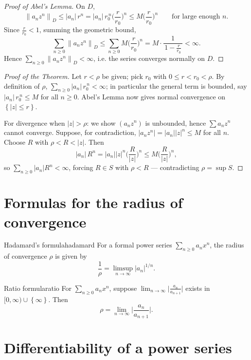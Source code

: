 \documentclass[11pt,openany]{report}
\newcommand{\abs}[1]{\left\lvert #1 \right\rvert}
\newcommand{\norm}[1]{\left\lVert #1 \right\rVert}
\newcommand{\set}[1]{\left\{ #1 \right\}}
\begin{document}
\begin{proof}[Proof of Abel's Lemma]
On $D$,
\[
  \norm{a_n z^n}_D \le \abs{a_n}\,r^{n}
  = \abs{a_n}\,r_0^{\,n}\Big(\frac{r}{r_0}\Big)^n
  \le M\Big(\frac{r}{r_0}\Big)^n \qquad\text{for large enough } n.
\]
Since $\frac{r}{r_0}<1$, summing the geometric bound,
\[
  \sum_{n\ge0}\norm{a_n z^n}_D \le \sum_{n\ge0} M\Big(\frac{r}{r_0}\Big)^n
  = M\cdot\frac{1}{\,1-\frac{r}{r_0}\,} < \infty.
\]
Hence $\sum_{n\ge0}\norm{a_n z^n}_D<\infty$, i.e. the series converges normally on $D$.
\end{proof}

\begin{proof}[Proof of the Theorem]
Let $r<\rho$ be given; pick $r_0$ with $0\le r<r_0<\rho$. By definition of $\rho$,
$\sum_{n\ge0}\abs{a_n}\,r_0^{\,n}<\infty$; in particular the general term is bounded, say
$\abs{a_n}\,r_0^{\,n}\le M$ for all $n\ge0$. Abel's Lemma now gives normal convergence on
$\set{\abs{z}\le r}$.

For divergence when $\abs{z}>\rho$: we show $(a_n z^n)$ is unbounded, hence
$\sum a_n z^n$ cannot converge. Suppose, for contradiction, $\abs{a_n z^n}=\abs{a_n}\abs{z}^n\le M$
for all $n$. Choose $R$ with $\rho<R<\abs{z}$. Then
\[
  \abs{a_n}\,R^n = \abs{a_n}\abs{z}^n\Big(\frac{R}{\abs{z}}\Big)^n
  \le M\Big(\frac{R}{\abs{z}}\Big)^n,
\]
so $\sum_{n\ge0}\abs{a_n}R^n<\infty$, forcing $R\in S$ with $\rho<R$ --- contradicting
$\rho=\sup S$.
\end{proof}

\section{Formulas for the radius of convergence}

\begin{theorem}{Hadamard's formula}{hadamard}
For a formal power series $\sum_{n\ge0}a_n x^n$, the radius of convergence $\rho$ is given
by
\[
  \boxed{\ \frac1\rho = \limsup_{n\to\infty}\abs{a_n}^{1/n}.\ }
\]
\end{theorem}

\begin{theorem}{Ratio formula}{ratio}
For $\sum_{n\ge0}a_n x^n$, suppose $\displaystyle\lim_{n\to\infty}\Big\lvert\frac{a_n}{a_{n+1}}\Big\rvert$
exists in $[0,\infty)\cup\set{\infty}$. Then
\[
  \boxed{\ \rho = \lim_{n\to\infty}\Big\lvert\frac{a_n}{a_{n+1}}\Big\rvert.\ }
\]
\end{theorem}

\section{Differentiability of a power series}
\end{document}
